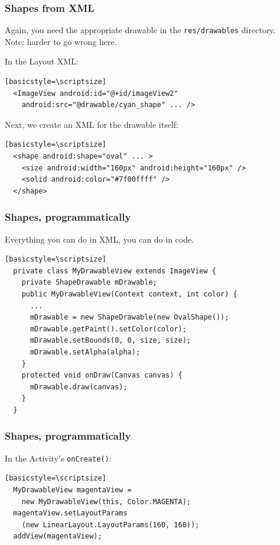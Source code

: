 \begin{frame}[fragile]
\frametitle{Shapes from XML}

\begin{changemargin}{1cm}
Again, you need the appropriate drawable in the {\tt res/drawables} directory.\\[1em]
Note: harder to go wrong here.

In the Layout XML:
\begin{verbatim}[basicstyle=\scriptsize]
  <ImageView android:id="@+id/imageView2"
    android:src="@drawable/cyan_shape" ... />
\end{verbatim}

Next, we create an XML for the drawable itself:
\begin{verbatim}[basicstyle=\scriptsize]
  <shape android:shape="oval" ... >
    <size android:width="160px" android:height="160px" />
    <solid android:color="#7f00ffff" />
  </shape>
\end{verbatim}

\end{changemargin}
\end{frame}

\begin{frame}[fragile]
\frametitle{Shapes, programmatically}
\begin{changemargin}{1cm}
Everything you can do in XML, you can do in code.

\begin{verbatim}[basicstyle=\scriptsize]
  private class MyDrawableView extends ImageView {
    private ShapeDrawable mDrawable;
    public MyDrawableView(Context context, int color) {
      ...
      mDrawable = new ShapeDrawable(new OvalShape());
      mDrawable.getPaint().setColor(color);
      mDrawable.setBounds(0, 0, size, size);
      mDrawable.setAlpha(alpha);
    }
    protected void onDraw(Canvas canvas) {
      mDrawable.draw(canvas);
    }
  }
\end{verbatim}

\end{changemargin}
\end{frame}

\begin{frame}[fragile]
\frametitle{Shapes, programmatically}
\begin{changemargin}{1cm}
In the Activity's {\tt onCreate()}:
\begin{verbatim}[basicstyle=\scriptsize]
  MyDrawableView magentaView = 
    new MyDrawableView(this, Color.MAGENTA);
  magentaView.setLayoutParams
    (new LinearLayout.LayoutParams(160, 160));
  addView(magentaView);
\end{verbatim}
\end{changemargin}
\end{frame}

